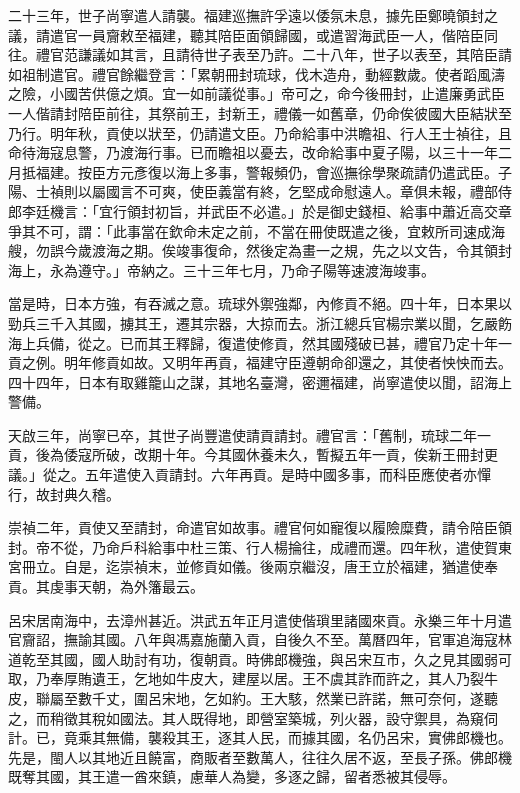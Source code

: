 \begin{pinyinscope}
二十三年，世子尚寧遣人請襲。福建巡撫許孚遠以倭氛未息，據先臣鄭曉領封之議，請遣官一員齎敕至福建，聽其陪臣面領歸國，或遣習海武臣一人，偕陪臣同往。禮官范謙議如其言，且請待世子表至乃許。二十八年，世子以表至，其陪臣請如祖制遣官。禮官餘繼登言：「累朝冊封琉球，伐木造舟，動經數歲。使者蹈風濤之險，小國苦供億之煩。宜一如前議從事。」帝可之，命今後冊封，止遣廉勇武臣一人偕請封陪臣前往，其祭前王，封新王，禮儀一如舊章，仍命俟彼國大臣結狀至乃行。明年秋，貢使以狀至，仍請遣文臣。乃命給事中洪瞻祖、行人王士禎往，且命待海寇息警，乃渡海行事。已而瞻祖以憂去，改命給事中夏子陽，以三十一年二月抵福建。按臣方元彥復以海上多事，警報頻仍，會巡撫徐學聚疏請仍遣武臣。子陽、士禎則以屬國言不可爽，使臣義當有終，乞堅成命慰遠人。章俱未報，禮部侍郎李廷機言：「宜行領封初旨，并武臣不必遣。」於是御史錢桓、給事中蕭近高交章爭其不可，謂：「此事當在欽命未定之前，不當在冊使既遣之後，宜敕所司速成海艘，勿誤今歲渡海之期。俟竣事復命，然後定為畫一之規，先之以文告，令其領封海上，永為遵守。」帝納之。三十三年七月，乃命子陽等速渡海竣事。

當是時，日本方強，有吞滅之意。琉球外禦強鄰，內修貢不絕。四十年，日本果以勁兵三千入其國，擄其王，遷其宗器，大掠而去。浙江總兵官楊宗業以聞，乞嚴飭海上兵備，從之。已而其王釋歸，復遣使修貢，然其國殘破已甚，禮官乃定十年一貢之例。明年修貢如故。又明年再貢，福建守臣遵朝命卻還之，其使者怏怏而去。四十四年，日本有取雞籠山之謀，其地名臺灣，密邇福建，尚寧遣使以聞，詔海上警備。

天啟三年，尚寧已卒，其世子尚豐遣使請貢請封。禮官言：「舊制，琉球二年一貢，後為倭寇所破，改期十年。今其國休養未久，暫擬五年一貢，俟新王冊封更議。」從之。五年遣使入貢請封。六年再貢。是時中國多事，而科臣應使者亦憚行，故封典久稽。

崇禎二年，貢使又至請封，命遣官如故事。禮官何如寵復以履險糜費，請令陪臣領封。帝不從，乃命戶科給事中杜三策、行人楊掄往，成禮而還。四年秋，遣使賀東宮冊立。自是，迄崇禎末，並修貢如儀。後兩京繼沒，唐王立於福建，猶遣使奉貢。其虔事天朝，為外籓最云。

呂宋居南海中，去漳州甚近。洪武五年正月遣使偕瑣里諸國來貢。永樂三年十月遣官齎詔，撫諭其國。八年與馮嘉施蘭入貢，自後久不至。萬曆四年，官軍追海寇林道乾至其國，國人助討有功，復朝貢。時佛郎機強，與呂宋互市，久之見其國弱可取，乃奉厚賄遺王，乞地如牛皮大，建屋以居。王不虞其詐而許之，其人乃裂牛皮，聯屬至數千丈，圍呂宋地，乞如約。王大駭，然業已許諾，無可奈何，遂聽之，而稍徵其稅如國法。其人既得地，即營室築城，列火器，設守禦具，為窺伺計。已，竟乘其無備，襲殺其王，逐其人民，而據其國，名仍呂宋，實佛郎機也。先是，閩人以其地近且饒富，商販者至數萬人，往往久居不返，至長子孫。佛郎機既奪其國，其王遣一酋來鎮，慮華人為變，多逐之歸，留者悉被其侵辱。


\end{pinyinscope}

